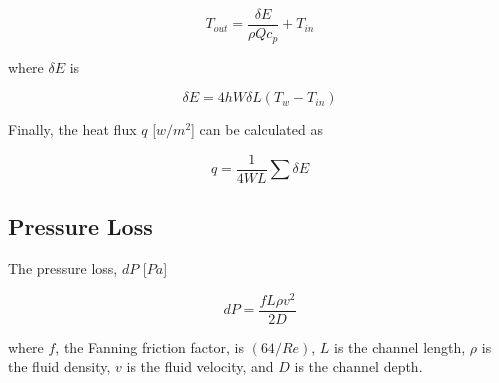 \documentclass{article}
\begin{document}
\begin{equation}
	T_{out} = \frac{ \delta E }{ \rho Q c_p } + T_{in}
\end{equation}

where $\delta E$ is

\begin{equation}
	\delta E = 4 h W \delta L (T_w - T_{in})
\end{equation}

Finally, the heat flux $q$ [$w/m^2$] can be calculated as 

\begin{equation}
	q = \frac{1}{4WL} \sum \delta E 
\end{equation}

\subsection{Pressure Loss}

The pressure loss, $dP$ [$Pa$]

\begin{equation}
	dP = \frac{ f L \rho v^2 }{2D}
\end{equation}

where $f$, the Fanning friction factor, is $(64/Re)$, $L$ is the channel length, $\rho$ is the fluid density, $v$ is the fluid velocity, and $D$ is the channel depth.
\end{document}
